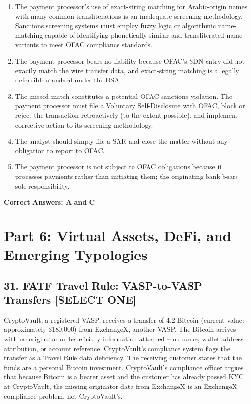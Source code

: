\documentclass[11pt,a4paper]{article}
\begin{document}
	\begin{enumerate}[label=\Alph*.]
		\item The payment processor's use of exact-string matching for Arabic-origin names with many common transliterations is an inadequate screening methodology. Sanctions screening systems must employ fuzzy logic or algorithmic name-matching capable of identifying phonetically similar and transliterated name variants to meet OFAC compliance standards.
		\item The payment processor bears no liability because OFAC's SDN entry did not exactly match the wire transfer data, and exact-string matching is a legally defensible standard under the BSA.
		\item The missed match constitutes a potential OFAC sanctions violation. The payment processor must file a Voluntary Self-Disclosure with OFAC, block or reject the transaction retroactively (to the extent possible), and implement corrective action to its screening methodology.
		\item The analyst should simply file a SAR and close the matter without any obligation to report to OFAC.
		\item The payment processor is not subject to OFAC obligations because it processes payments rather than initiating them; the originating bank bears sole responsibility.
	\end{enumerate}
	\textbf{Correct Answers: A and C}
	
	\section{Part 6: Virtual Assets, DeFi, and Emerging Typologies}
	
	\subsection{31. FATF Travel Rule: VASP-to-VASP Transfers \textnormal{[SELECT ONE]}}
	
	CryptoVault, a registered VASP, receives a transfer of 4.2 Bitcoin (current value: approximately \$180,000) from ExchangeX, another VASP. The Bitcoin arrives with no originator or beneficiary information attached -- no name, wallet address attribution, or account reference. CryptoVault's compliance system flags the transfer as a Travel Rule data deficiency. The receiving customer states that the funds are a personal Bitcoin investment. CryptoVault's compliance officer argues that because Bitcoin is a bearer asset and the customer has already passed KYC at CryptoVault, the missing originator data from ExchangeX is an ExchangeX compliance problem, not CryptoVault's.
	
\end{document}
